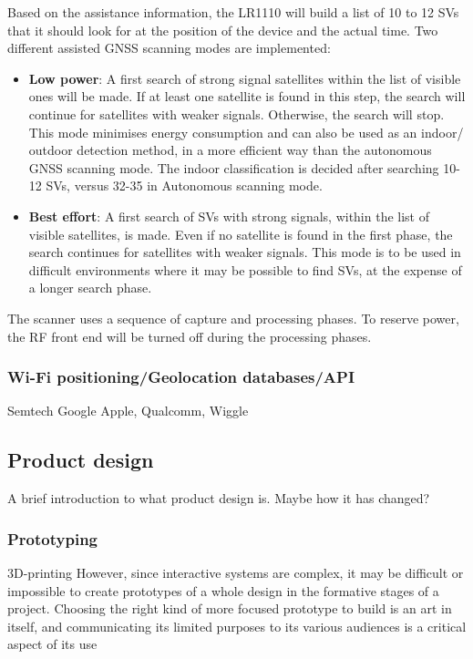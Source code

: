 Based on the assistance information, the LR1110 will build a list of 10 to 12 \ac{SV}s that it should look for at the position of the device and the actual time.
Two different assisted \ac{GNSS} scanning modes are implemented:
\begin{itemize}
\item \textbf{Low power}: A first search of strong signal satellites within the list of visible ones will be made. If at least one satellite is found in this step, the search will continue for satellites with weaker signals. Otherwise, the search will stop. This mode minimises energy consumption and can also be used as an indoor/ outdoor detection method, in a more efficient way than the autonomous \ac{GNSS} scanning mode. The indoor classification is decided after searching 10-12 \ac{SV}s, versus 32-35 in Autonomous scanning mode.
\item \textbf{Best effort}: A first search of \ac{SV}s with strong signals, within the list of visible satellites, is made. Even if no satellite is found in the first phase, the search continues for satellites with weaker signals. This mode is to be used in difficult environments where it may be possible to find \ac{SV}s, at the expense of a longer search phase.
\end{itemize}
The scanner uses a sequence of capture and processing phases. To reserve power, the \ac{RF} front end will be turned off during the processing phases.

\subsubsection{Wi-Fi positioning/Geolocation databases/API}
Semtech
Google
Apple, Qualcomm, Wiggle

\subsection{Product design}
A brief introduction to what product design is. Maybe how it has changed?

\subsubsection{Prototyping}




3D-printing
However, since interactive systems are complex, it may be difficult or impossible to create prototypes of a whole design in the formative stages of a project.
Choosing the right kind of more focused prototype to build is an art in itself, and communicating its limited purposes to its various audiences is a critical aspect of its use

